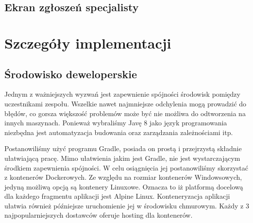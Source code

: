 \documentclass[10pt, titlepage, oneside, a4paper]{article}
\begin{document}
	\subsection{Ekran zgłoszeń specjalisty}
	\begin{figure}[!htbp]
  \begin{center}
  {%
		\setlength{\fboxsep}{0.5pt}%
		\setlength{\fboxrule}{0.5pt}%
	}%
  \end{center}
  \end{figure}
	\newpage 
  
	\section{Szczegóły implementacji}  
  
	\subsection{Środowisko deweloperskie}  
	Jednym z ważniejszych wyzwań jest zapewnienie spójności środowisk pomiędzy uczestnikami zespołu. Wszelkie nawet najmniejsze odchylenia mogą prowadzić do błędów, co gorsza większość problemów może być nie możliwa do odtworzenia na innych maszynach. Ponieważ wybraliśmy Javę 8 jako język programowania niezbędna jest automatyzacja budowania oraz zarządzania zależnościami itp.
	
	Postanowiliśmy użyć programu Gradle, posiada on prostą i przejrzystą składnie ułatwiającą pracę. Mimo ułatwienia jakim jest Gradle, nie jest wystarczającym środkiem zapewnienia spójności. W celu osiągnięcia jej postanowiliśmy skorzystać z kontenerów Dockerowych. Ze względu na rozmiar kontenerów Windowsowych, jedyną możliwą opcją są kontenery Linuxowe. Oznacza to iż platformą docelową dla każdego fragmentu aplikacji jest Alpine Linux. Konteneryzacja aplikacji ułatwia również późniejsze uruchomienie jej w środowisku chmurowym. Każdy z 3 najpopularniejszych dostawców oferuje hosting dla kontenerów.
  
\end{document}
